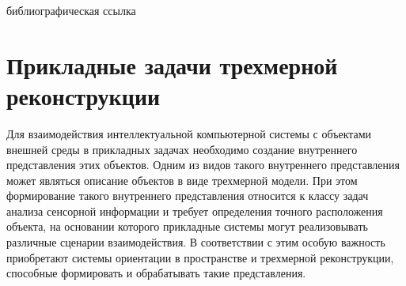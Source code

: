 \begin{SCn}
    \bigskip

    \begin{scnrelfromlist}{библиографическая ссылка}
    \end{scnrelfromlist}

\end{SCn}

\section{Прикладные задачи трехмерной реконструкции}
\label{sec_3d_models_problems}

Для взаимодействия интеллектуальной компьютерной системы с объектами внешней среды в прикладных задачах необходимо создание внутреннего представления этих объектов. Одним из видов такого внутреннего представления может являться описание объектов в виде трехмерной модели. При этом формирование такого внутреннего представления относится к классу задач анализа сенсорной информации и требует определения точного расположения объекта, на основании которого прикладные системы могут реализовывать различные сценарии взаимодействия. В соответствии с этим особую важность приобретают системы ориентации в пространстве и трехмерной реконструкции, способные формировать и обрабатывать такие представления.

